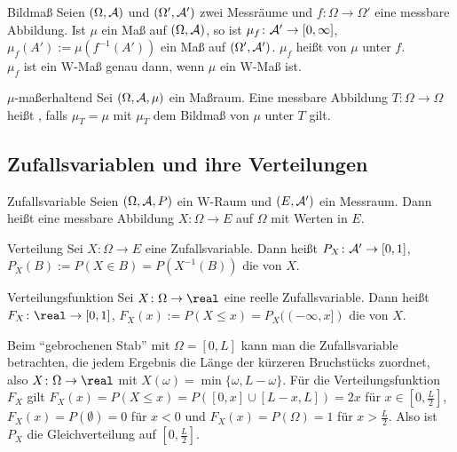 \linie

\begin{Def}{Bildmaß}
    Seien $(\Omega, \mathcal{A})$ und $(\Omega', \mathcal{A}')$ zwei Messräume und
    $f\colon \Omega \rightarrow \Omega'$ eine messbare Abbildung.
    Ist $\mu$ ein Maß auf $(\Omega, \mathcal{A})$, so ist $\mu_f\colon \mathcal{A}' \rightarrow [0, \infty]$,
    $\mu_f(A') := \mu(f^{-1}(A'))$ ein Maß auf $(\Omega', \mathcal{A}')$.
    $\mu_f$ heißt  von $\mu$ unter $f$.\\
    $\mu_f$ ist ein W-Maß genau dann, wenn $\mu$ ein W-Maß ist.
\end{Def}

\begin{Def}{$\mu$-maßerhaltend}
    Sei $(\Omega, \mathcal{A}, \mu)$ ein Maßraum.
    Eine messbare Abbildung $T\colon \Omega \rightarrow \Omega$ heißt ,
    falls $\mu_T = \mu$ mit $\mu_T$ dem Bildmaß von $\mu$ unter $T$ gilt.
\end{Def}

\pagebreak

\subsection{%
    Zufallsvariablen und ihre Verteilungen%
}

\begin{Def}{Zufallsvariable}
    Seien $(\Omega, \mathcal{A}, P)$ ein W-Raum und $(E, \mathcal{A}')$ ein Messraum.
    Dann heißt eine messbare Abbildung $X\colon \Omega \rightarrow E$
     auf $\Omega$ mit Werten in $E$.
\end{Def}

\begin{Def}{Verteilung}
    Sei $X\colon \Omega \rightarrow E$ eine Zufallsvariable.
    Dann heißt $P_X\colon \mathcal{A}' \rightarrow [0, 1]$, $P_X(B) := P(X \in B) = P(X^{-1}(B))$
    die  von $X$.
\end{Def}

\begin{Def}{Verteilungsfunktion}
    Sei $X\colon \Omega \rightarrow \real$ eine reelle Zufallsvariable.
    Dann heißt $F_X\colon \real \rightarrow [0, 1]$, $F_X(x) := P(X \le x) = P_X((-\infty, x])$
    die  von $X$.
\end{Def}

\begin{Bsp}
    Beim "`gebrochenen Stab"' mit $\Omega = [0, L]$ kann man die Zufallsvariable betrachten,
    die jedem Ergebnis die Länge der kürzeren Bruchstücks zuordnet, also
    $X\colon \Omega \rightarrow \real$ mit $X(\omega) = \min\{\omega, L - \omega\}$.
    Für die Verteilungsfunktion $F_X$ gilt $F_X(x) = P(X \le x) = P([0, x] \cup [L - x, L]) = 2x$
    für $x \in [0, \frac{L}{2}]$,
    $F_X(x) = P(\emptyset) = 0$ für $x < 0$ und $F_X(x) = P(\Omega) = 1$ für $x > \frac{L}{2}$.
    Also ist $P_X$ die Gleichverteilung auf $[0, \frac{L}{2}]$.
\end{Bsp}


